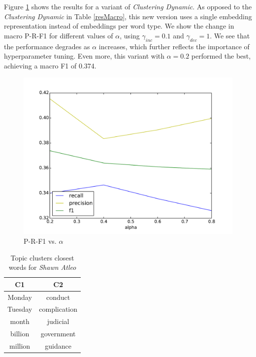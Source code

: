 \documentclass{sig-alternate}
\begin{document}
{{%

Figure \ref{varyingalpha} shows the results for a variant of {\textit{Clustering Dynamic}}. As opposed to the {\textit{Clustering Dynamic}} in Table \ref{resMacro}, this new version uses a single embedding representation instead of embeddings per word type. We show the change in macro P-R-F1 for different values of $\alpha$, using $\gamma_{inc}=0.1$ and $\gamma_{dec}=1$. We see that the performance degrades as $\alpha$ increases, which further reflects the importance of hyperparameter tuning. Even more, this variant with $\alpha=0.2$ performed the best, achieving a macro F1 of 0.374.

\begin{figure}[tb]
\centering
\includegraphics[width=0.8\columnwidth]{fig/alphaPlotMacro.pdf}
\caption{P-R-F1 vs. $\alpha$}
\label{varyingalpha}
\end{figure}

\begin{table}[tb]
\center
\begin{tabular}{cc}
\toprule
\textbf{C1} & \textbf{C2} \\
\midrule
Monday & conduct \\ %
Tuesday & complication \\ %
month & judicial \\ %
billion & government \\ %
million & guidance \\
\bottomrule
\end{tabular}
\caption{Topic clusters closest words for \emph{Shawn Atleo}}
\label{clusterresult}
\end{table}

}}
\end{document}
